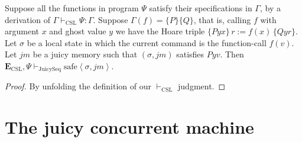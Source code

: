 \begin{theorem}
\label{thm:seplogsound}
Suppose all the functions in program $\Psi$ satisfy their
specifications in $\Gamma$,
by a derivation of $\Gamma \vdash_\mathrm{CSL} \Psi:\Gamma$.
Suppose $\Gamma(f)=\{P\}\{Q\}$, that is,
calling $f$ with argument $x$
and ghost value $y$
we have the Hoare
triple
$\{Pyx\}\,r:=f(x)\,\{Qyr\}$.
  Let $\sigma$ be a local state in which the current command
  is the function-call $f(v)$.  Let $\mathit{jm}$ be a juicy
  memory such that $(\sigma,\mathit{jm})$ satisfies $Pyv$.
  Then
  $\mathbf{E}_\mathrm{CSL}, \Psi \vdash_\mathrm{JuicySeq}
  \mathrm{safe}\left<\sigma,\mathit{jm}\right>$.
\end{theorem}
\begin{proof}
  By unfolding the definition of our 
  $\vdash_\mathrm{CSL}$ judgment.
\end{proof}



\section{The juicy concurrent machine}
\label{sec:juicyconc}

